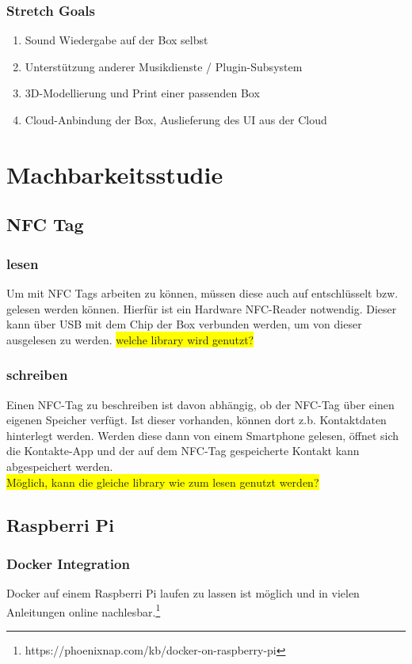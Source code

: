 \documentclass[10pt, a4paper, draft]{article}
\begin{document}
\subsubsection{Stretch Goals}
\begin{enumerate}
  \item Sound Wiedergabe auf der Box selbst
  \item Unterstützung anderer Musikdienste / Plugin-Subsystem
  \item 3D-Modellierung und Print einer passenden Box
  \item Cloud-Anbindung der Box, Auslieferung des UI aus der Cloud
\end{enumerate}

\section{Machbarkeitsstudie}

\subsection{NFC Tag}
\subsubsection{lesen}
Um mit NFC Tags arbeiten zu können, müssen diese auch auf entschlüsselt bzw. gelesen werden können.
Hierfür ist ein Hardware NFC-Reader notwendig. Dieser kann über USB mit dem Chip der Box verbunden werden, um von dieser ausgelesen zu werden.
\colorbox{yellow}{welche library wird genutzt?}

\subsubsection{schreiben}
Einen NFC-Tag zu beschreiben ist davon abhängig, ob der NFC-Tag über einen eigenen Speicher verfügt.
Ist dieser vorhanden, können dort z.b. Kontaktdaten hinterlegt werden. Werden diese dann von einem Smartphone gelesen, öffnet sich die Kontakte-App und der auf dem NFC-Tag gespeicherte Kontakt kann abgespeichert werden.
\\
\colorbox{yellow}{Möglich, kann die gleiche library wie zum lesen genutzt werden?}

\subsection{Raspberri Pi}
\subsubsection{Docker Integration}
Docker auf einem Raspberri Pi laufen zu lassen ist möglich und in vielen Anleitungen online nachlesbar.\footnote{https://phoenixnap.com/kb/docker-on-raspberry-pi}
\end{document}
